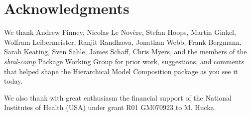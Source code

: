 
\section{Acknowledgments}

We thank Andrew Finney, Nicolas Le Nov\`{e}re, Stefan Hoops, Martin
Ginkel, Wolfram Leibermeister, Ranjit Randhawa, Jonathan Webb, Frank
Bergmann, Sarah Keating, Sven Sahle, James Schaff, Chris Myers, and the
members of the \emph{sbml-comp} Package Working Group for prior work,
suggestions, and comments that helped shape the Hierarchical Model
Composition package as you see it today.

We also thank with great enthusiasm the financial support of the National
Institutes of Health (USA) under grant R01 GM070923 to M. Hucka.
